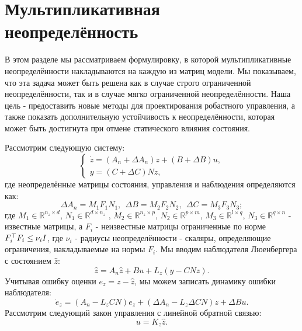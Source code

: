 \section{Мультипликативная неопределённость}\label{sec:ch3/sect2}
В этом разделе мы рассматриваем формулировку, в которой мультипликативные неопределённости накладываются на каждую из матриц модели. Мы показываем, что эта задача может быть решена как в случае строго ограниченной неопределённости, так и в случае мягко ограниченной неопределённости. Наша цель - предоставить новые методы для проектирования робастного управления, а также показать дополнительную устойчивость к неопределённости, которая может быть достигнута при отмене статического влияния состояния.

Рассмотрим следующую систему: 
%
\begin{equation}
	\label{eq:part2_linear_dynamics}
	\begin{cases}
		\dot z=({A}_n+\Delta {A}_n)z + ({B}+\Delta {B})u,\\
		y = ({C}+ \Delta {C}){N}  z,
	\end{cases}
\end{equation}
%
где неопределённые матрицы состояния, управления и наблюдения определяются как:
%
\begin{equation}
	\label{eq:part2_uncertainty}
	\Delta {A}_n={M}_1{F}_1{N}_1, \ \ \Delta {B}= {M}_2{F}_2{N}_2, \ \
	\Delta {C} = {M}_3{F}_3{N}_3; 
\end{equation}
%
где ${M}_1 \in \mathbb{R}^{n_z \times d}$, 
${N}_1 \in \mathbb{R}^{d \times n_z}$ , ${M}_2 \in \mathbb{R}^{n_z \times p}$,
${N}_2 \in \mathbb{R}^{p \times m}$, ${M}_3 \in \mathbb{R}^{l \times q}$,
${N}_3 \in \mathbb{R}^{q \times n}$ - известные матрицы, а ${F}_i$ - неизвестные матрицы ограниченные по норме ${F}_i^\top{F}_i\leq \nu_i {I}$, где $\nu_i$ - радиусы неопределённости - скаляры, определяющие ограничения, накладываемые на нормы ${F}_i$. Мы вводим наблюдателя Люенбергера с состоянием $\hat{z}$:
%
\begin{equation}
	\hat{z}={A}_n\hat{z}+{B}u+{L}_z(y- {C} {N}\hat{z}).
\end{equation}
%
Учитывая ошибку оценки $e_z=z-\hat{z}$, мы можем записать динамику ошибки наблюдателя:
%
\begin{equation}
	\label{eq:part2_error_dynamics}
	\dot{e}_z=({A}_n-{L}_z{C}{N}) e_z +(\Delta {A}_n -{L}_z\Delta {C}{N}) z +\Delta {B} u.
\end{equation}
%
Рассмотрим следующий закон управления с линейной обратной связью:
%
\begin{equation}
	u={K}_z\hat{z}.
\end{equation}
